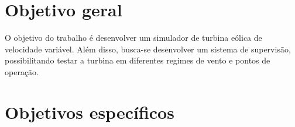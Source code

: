 
\section{Objetivo geral}

    \par O objetivo do trabalho é desenvolver um simulador de turbina eólica de velocidade variável. Além disso, busca-se desenvolver um sistema de supervisão, possibilitando testar a turbina em diferentes regimes de vento e pontos de operação.


\section{Objetivos específicos}



